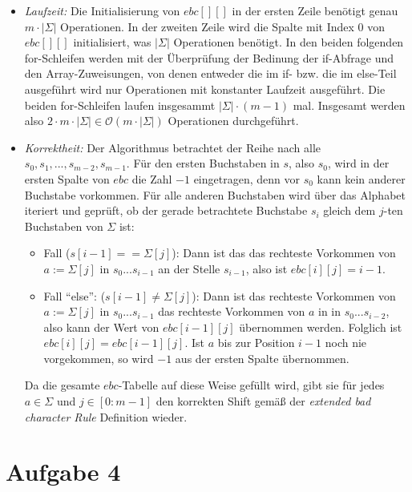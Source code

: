 \documentclass[a4paper,10pt,oneside,leqno]{scrartcl}
\begin{document}
\begin{itemize}
 \item \textit{Laufzeit:} Die Initialisierung von $ebc[][]$ in der ersten Zeile benötigt genau $m\cdot |\Sigma|$ Operationen. In der zweiten Zeile
 wird die Spalte mit Index 0 von $ebc[][]$ initialisiert, was $|\Sigma|$ Operationen benötigt. In den beiden folgenden for-Schleifen werden
 mit der Überprüfung der Bedinung der if-Abfrage und den Array-Zuweisungen, von denen entweder die im if- bzw. die im else-Teil ausgeführt
 wird nur Operationen mit konstanter Laufzeit ausgeführt. Die beiden for-Schleifen laufen insgesammt $|\Sigma| \cdot (m-1)$ mal. Insgesamt
 werden also $2\cdot m\cdot |\Sigma|\in \mathcal{O}(m\cdot |\Sigma|)$ Operationen durchgeführt.
 \item \textit{Korrektheit:} Der Algorithmus betrachtet der Reihe nach alle $s_0,s_1,...,s_{m-2},s_{m-1}$. Für den ersten Buchstaben in $s$,
 also $s_0$, wird in der ersten Spalte von $ebc$ die Zahl $-1$ eingetragen, denn vor $s_0$ kann kein anderer Buchstabe vorkommen.
 Für alle anderen Buchstaben wird über das Alphabet iteriert und geprüft, ob der gerade betrachtete Buchstabe $s_i$ gleich dem $j$-ten Buchstaben
 von $\Sigma$ ist:
  \begin{itemize}
   \item Fall ($s[i-1]==\Sigma[j]$): Dann ist das das rechteste Vorkommen von $a:=\Sigma[j]$ in $s_0...s_{i-1}$ an der Stelle $s_{i-1}$, also ist
   $ebc[i][j] = i-1$.
   \item Fall ``else'': ($s[i-1]\neq \Sigma[j]$): Dann ist das rechteste Vorkommen von $a:=\Sigma[j]$ in $s_0...s_{i-1}$ das rechteste Vorkommen
   von $a$ in in $s_0...s_{i-2}$, also kann der Wert von $ebc[i-1][j]$ übernommen werden. Folglich ist $ebc[i][j] = ebc[i-1][j]$. Ist $a$ bis zur
   Position $i-1$ noch nie vorgekommen, so wird $-1$ aus der ersten Spalte übernommen.
  \end{itemize}
  Da die gesamte $ebc$-Tabelle auf diese Weise gefüllt wird, gibt sie für jedes $a\in \Sigma$ und $j\in [0:m-1]$ den korrekten Shift gemäß der
  \textit{extended bad character Rule} Definition wieder.
\end{itemize}


\section*{Aufgabe 4}%
\end{document}
